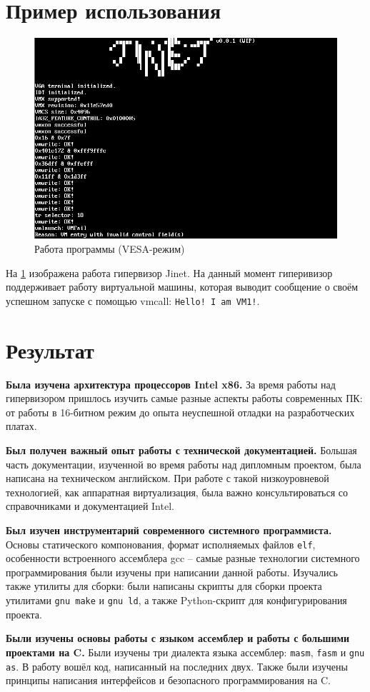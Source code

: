 \documentclass[a4paper,12pt]{extarticle}
\begin{document}
	\section{Пример использования}
	\begin{figure}[htb]
		\centering
		\includegraphics[width=0.55\linewidth]{../diagrams/jinet_vesa}
		\caption{Работа программы (VESA-режим)}
		\label{fig:jinetvesa}
	\end{figure}
	На \cref{fig:jinetvesa} изображена работа гипервизор Jinet. На данный момент гиперивизор поддерживает работу виртуальной машины, которая выводит сообщение о своём успешном запуске с помощью vmcall: \texttt{Hello! I am VM1!}.
	\section{Результат}
	\textbf{Была изучена архитектура процессоров Intel x86.} За время работы над гипервизором пришлось изучить самые разные аспекты работы современных ПК: от работы в 16-битном режим до опыта неуспешной отладки на разработческих платах.\par
	\textbf{Был получен важный опыт работы с технической документацией.} Большая часть документации, изученной во время работы над дипломным проектом, была написана на техническом английском. При работе с такой низкоуровневой технологией, как аппаратная виртуализация, была важно консультироваться со справочниками и документацией Intel.\par
	\textbf{Был изучен инструментарий современного системного программиста.} Основы статического компонования, формат исполняемых файлов \texttt{elf}, особенности встроенного ассемблера gcc -- самые разные технологии системного программирования были изучены при написании данной работы. Изучались также утилиты для сборки: были написаны скрипты для сборки проекта утилитами \texttt{gnu make} и \texttt{gnu ld}, а также Python-скрипт для конфигурирования проекта.\par
	\textbf{Были изучены основы работы с языком ассемблер и работы с большими проектами на C.} Были изучены три диалекта языка ассемблер: \texttt{masm}, \texttt{fasm} и \texttt{gnu as}. В работу вошёл код, написанный на последних двух. Также были изучены принципы написания интерфейсов и безопасного программирования на C.\par
\end{document}
